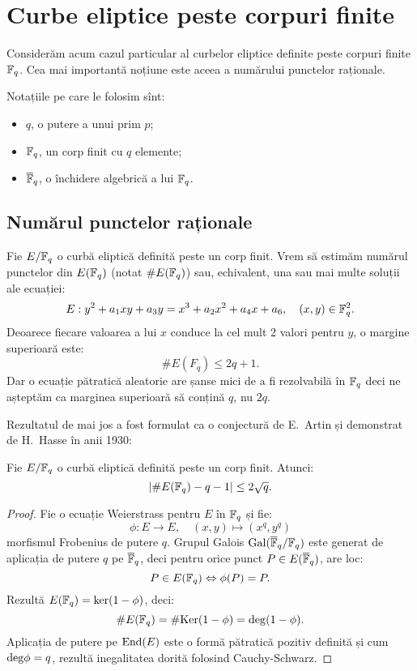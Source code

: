
\chapter{Curbe eliptice peste corpuri finite}

Considerăm acum cazul particular al curbelor eliptice definite peste corpuri
finite $ \mathbb{F}_q $. Cea mai importantă noțiune este aceea a numărului punctelor
raționale.

Notațiile pe care le folosim sînt:
\begin{itemize}
    \item $ q $, o putere a unui prim $ p $;
    \item $ \mathbb{F}_q $, un corp finit cu $ q $ elemente;
    \item $ \overline{\mathbb{F}}_q $, o închidere algebrică a lui $ \mathbb{F}_q $.
\end{itemize}

\section{Numărul punctelor raționale}

Fie $ E/\mathbb{F}_q $ o curbă eliptică definită peste un corp finit.
Vrem să estimăm numărul punctelor din $ E(\mathbb{F}_q) $ (notat $ \#E(\mathbb{F}_q) $) sau, echivalent,
una sau mai multe soluții ale ecuației:
\[
    E : y^2 + a_1xy + a_3y = x^3 + a_2x^2 + a_4x + a_6, \quad (x, y) \in \mathbb{F}_q^2.
\]
Deoarece fiecare valoarea a lui $ x $ conduce la cel mult 2 valori pentru $ y $,
o margine superioară este:
\[
    \# E(F_q) \leq 2q + 1.
\]
Dar o ecuație pătratică aleatorie are șanse mici de a fi rezolvabilă în $ \mathbb{F}_q $
deci ne așteptăm ca marginea superioară să conțină $ q $, nu $ 2q $.

Rezultatul de mai jos a fost formulat ca o conjectură de E.\ Artin și demonstrat
de H.\ Hasse în anii 1930:
\begin{theorem}[Hasse]\label{thm:hasse}
    Fie $ E/\mathbb{F}_q $ o curbă eliptică definită peste un corp finit. Atunci:
    \[
        | \#E(\mathbb{F}_q) - q - 1 | \leq 2 \sqrt{q}.
    \]
\end{theorem}
\begin{proof}
    Fie o ecuație Weierstrass pentru $ E $ în $ \mathbb{F}_q $ și fie:
    \[
        \phi : E \to E, \quad (x, y) \mapsto (x^q, y^q)
    \]
    morfismul Frobenius de putere $ q $. Grupul Galois $ \mathrm{Gal}(\overline{\mathbb{F}}_q/\mathbb{F}_q) $
    este generat de aplicația de putere $ q $ pe $ \overline{\mathbb{F}}_q $, deci pentru
    orice punct $ P \in E(\overline{\mathbb{F}}_q) $, are loc:
    \[
        P \in E(\mathbb{F}_q) \Leftrightarrow \phi(P) = P.
    \]
    Rezultă $ E(\mathbb{F}_q) = \mathrm{ker}(1 - \phi) $, deci:
    \[
        \# E(\mathbb{F}_q) = \# \mathrm{Ker}(1 - \phi) = \mathrm{deg}(1 - \phi).
    \]
    Aplicația de putere pe $ \mathrm{End}(E) $ este o formă pătratică pozitiv definită și
    cum $ \mathrm{deg}\phi = q $, rezultă inegalitatea dorită folosind Cauchy-Schwarz.
\end{proof}

